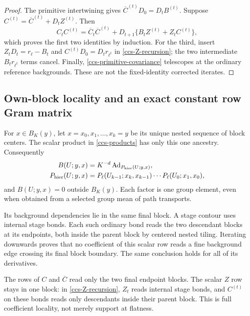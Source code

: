 \begin{proof}
The primitive intertwining gives
\(\overline C^{(t)}D_0=D_tB^{(t)}\).
Suppose \(C^{(t)}=\overline C^{(t)}+D_tZ^{(t)}\).
Then
\[
 C_tC^{(t)}
  =\overline C_t\overline C^{(t)}
        +D_{t+1}\{B_tZ^{(t)}+Z_tC^{(t)}\},
\]
which proves the first two identities by induction.
For the third, insert
\(Z_tD_t=r_\ell-B_t\) and
\(C^{(t)}D_0=D_tr_{\ell^t}\) in
\eqref{ccs-Z-recursion}; the two intermediate
\(B_tr_{\ell^t}\) terms cancel.
Finally, \eqref{ccs-primitive-covariance} telescopes at the
ordinary reference backgrounds. These are not the
fixed-identity corrected iterates.
\end{proof}

\subsection{Own-block locality and an exact constant row Gram matrix}
\label{ccs-locality-section}

For \(x\in B_K(y)\), let
\(x=x_0,x_1,\ldots,x_k=y\) be its unique nested sequence of
block centers. The scalar product in \eqref{ccs-products}
has only this one ancestry. Consequently
\begin{equation}
 \begin{split}
 B(U;y,x)&=K^{-d}\operatorname{Ad}_{P_{\rm hier}(U;y,x)},\\
 P_{\rm hier}(U;y,x)
  &=P_\ell(U_{k-1};x_k,x_{k-1})\cdots
                                 P_\ell(U_0;x_1,x_0),
 \end{split}
 \label{ccs-hierarchical-B}
\end{equation}
and \(B(U;y,x)=0\) outside \(B_K(y)\).
Each factor is one group element, even when obtained from a
selected group mean of path transports.

Its background dependencies lie in the same final block.
A stage contour uses internal stage bonds. Each such ordinary
bond reads the two descendant blocks at its endpoints, both
inside the parent block by centered nested tiling. Iterating
downwards proves that no coefficient of this scalar row reads
a fine background edge crossing its final block boundary.
The same conclusion holds for all of its derivatives.

The rows of \(C\) and \(\overline C\) read only the two final
endpoint blocks. The scalar \(Z\) row stays in one block:
in \eqref{ccs-Z-recursion}, \(Z_t\) reads internal stage bonds,
and \(C^{(t)}\) on these bonds reads only descendants inside
their parent block. This is full coefficient locality, not
merely support at flatness.

